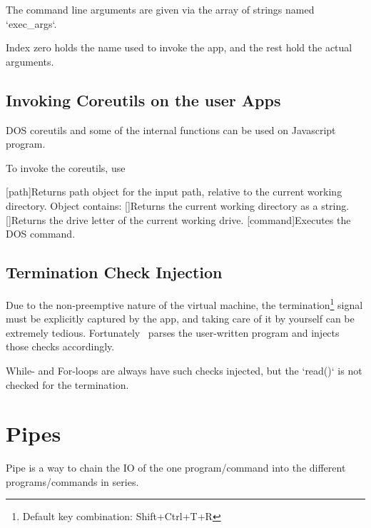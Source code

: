 The command line arguments are given via the array of strings named `exec\_args`.

Index zero holds the name used to invoke the app, and the rest hold the actual arguments.


\section{Invoking Coreutils on the user Apps}

DOS coreutils and some of the internal functions can be used on Javascript program.

To invoke the coreutils, use 

\begin{outline}
\1[path]{Returns path object for the input path, relative to the current working directory. Object contains:}
 \2
 \2
 \2
 \2
\1[]{Returns the current working directory as a string.}
\1[]{Returns the drive letter of the current working drive.}
\1[command]{Executes the DOS command.}
\end{outline}


\section{Termination Check Injection}

Due to the non-preemptive nature of the virtual machine, the termination\footnote{Default key combination: Shift+Ctrl+T+R} signal must be explicitly captured by the app, and taking care of it by yourself can be extremely tedious. Fortunately \thedos\ parses the user-written program and injects those checks accordingly.

While- and For-loops are always have such checks injected, but the `read()` is not checked for the termination.


\chapter{Pipes}

Pipe is a way to chain the IO of the one program/command into the different programs/commands in series.

